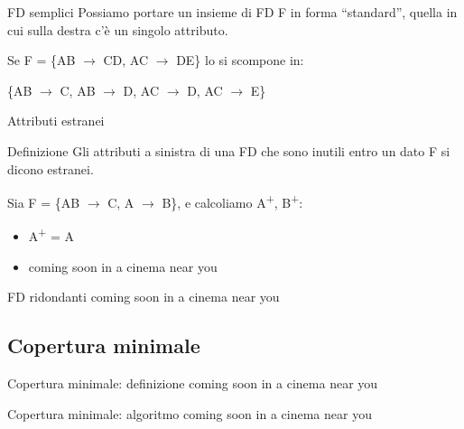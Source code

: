 \documentclass{beamer}
\begin{document}
\begin{frame}{FD semplici}
    Possiamo portare un insieme di FD F in forma “standard”, quella in cui sulla destra c’è un singolo attributo.\par
    Se F = \{AB $\rightarrow$ CD, AC $\rightarrow$ DE\} lo si scompone in:\par\hspace{1cm} 
            \{AB $\rightarrow$ C, AB $\rightarrow$ D, AC $\rightarrow$ D, AC $\rightarrow$ E\} 
    
\end{frame}

\begin{frame}{Attributi estranei}
    \begin{block}{Definizione}
    Gli attributi a sinistra di una FD che sono inutili entro un dato F si dicono estranei.
    \end{block}
    Sia F = \{AB $\rightarrow$ C, A $\rightarrow$ B\}, e calcoliamo A\textsuperscript{+}, B\textsuperscript{+}:\par
    \begin{itemize}
        \item A\textsuperscript{+} = A
        \item coming soon in a cinema near you
    \end{itemize}
    
\end{frame}

\begin{frame}{FD ridondanti}
    coming soon in a cinema near you
\end{frame}

\subsection{Copertura minimale}
\begin{frame}{Copertura minimale: definizione}
    coming soon in a cinema near you
\end{frame}
\begin{frame}{Copertura minimale: algoritmo}
    coming soon in a cinema near you
\end{frame}
\end{document}
